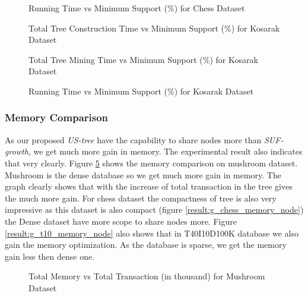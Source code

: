             \begin{figure}[h]
            \centering
                
            \caption{Running Time vs Minimum Support (\%) for Chess Dataset }
            \label{result:g_chess_total}
            \end{figure}
            \begin{figure}[h]
            \centering
                
            \caption{Total Tree Construction Time vs Minimum Support (\%) for Kosarak Dataset }
            \label{result:g_k_tree_construction_total}
            \end{figure}
            
            \begin{figure}[h]
            \centering
                
            \caption{Total Tree Mining Time vs Minimum Support (\%) for Kosarak Dataset }
            \label{result:g_k_mining_total}
            \end{figure}

            \begin{figure}[h]
            \centering
                
            \caption{Running Time vs Minimum Support (\%) for Kosarak Dataset }
            \label{result:g_k_total}
            \end{figure}
            
\clearpage
    \subsubsection{Memory Comparison}
        As our proposed \emph{US-tree} have the capability to share nodes more than \emph{SUF-growth}, we get much more gain in memory. The experimental result also indicates that very clearly. Figure \ref{result:g_m_memory_node} shows the memory comparison on mushroom dataset. Mushroom is the dense database so we get  much more gain in memory. The graph clearly shows that with the increase of total transaction in the tree gives the much more gain. For chess dataset the compactness of tree is also very impressive as this dataset is also compact (figure \ref{result:g_chess_memory_node}) the Dense dataset have more scope to share nodes more. Figure \ref{result:g_t10_memory_node} also shows that in T40I10D100K database we also gain the memory optimization. As the database is sparse, we get the memory gain less then dense one.
            \begin{figure}[h]
            \centering
                
            \caption{Total Memory vs Total Transaction (in thousand) for Mushroom Dataset }
            \label{result:g_m_memory_node}
            \end{figure}
            
